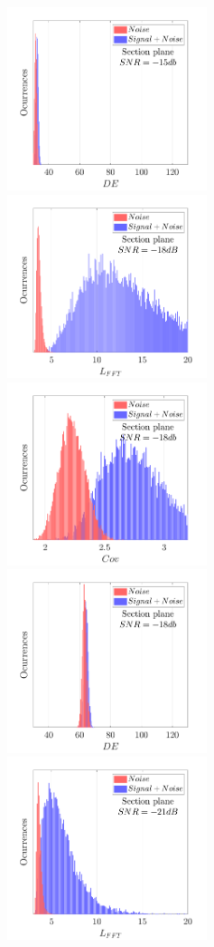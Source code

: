\documentclass[lettersize,journal]{IEEEtran}
\begin{document}
\begin{figure}
    \includegraphics[width = 2.3in]{histE-15db.png}\\
    \includegraphics[width = 2.3in]{histL-18db.png} 
    \includegraphics[width = 2.3in]{histCov-18db.png}
    \includegraphics[width = 2.3in]{histE-18db.png}\\
    \includegraphics[width = 2.3in]{histL-21db.png} 

\end{figure}
\end{document}
